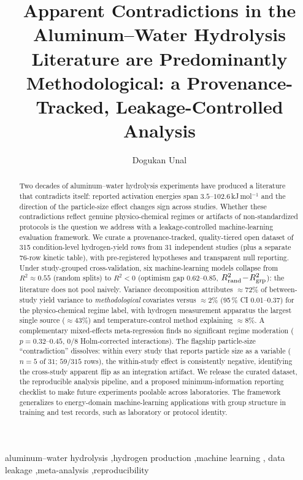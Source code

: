 \documentclass[preprint,12pt]{elsarticle}
\begin{document}
\begin{frontmatter}

\title{Apparent Contradictions in the Aluminum--Water Hydrolysis Literature
are Predominantly Methodological: a Provenance-Tracked, Leakage-Controlled Analysis}

\author[a]{Dogukan Unal}

\begin{abstract}
\noindent Two decades of aluminum--water hydrolysis experiments have produced a literature
that contradicts itself: reported activation energies span $3.5$--$102.6$\,kJ\,mol$^{-1}$
and the direction of the particle-size effect changes sign across studies. Whether these
contradictions reflect genuine physico-chemical regimes or artifacts of non-standardized
protocols is the question we address with a leakage-controlled machine-learning evaluation
framework. We curate a provenance-tracked, quality-tiered open dataset of 315 condition-level
hydrogen-yield rows from 31 independent studies (plus a separate 76-row kinetic table), with
pre-registered hypotheses and transparent null reporting. Under study-grouped cross-validation,
six machine-learning models collapse from $R^2\!\approx\!0.55$ (random splits)
to $R^2<0$ (optimism gap $0.62$--$0.85$, $R^2_{\rm rand}\!-\!R^2_{\rm grp}$): the literature does not pool naively. Variance decomposition attributes $\approx\!72\%$ of between-study
yield variance to \emph{methodological} covariates versus $\approx\!2\%$
(95\,\% CI 0.01--0.37) for the physico-chemical regime label,
with hydrogen measurement apparatus the largest single source ($\approx\!43\%$)
and temperature-control method explaining $\approx\!8\%$. A complementary mixed-effects meta-regression finds no significant
regime moderation ($p=0.32$--$0.45$, $0/8$ Holm-corrected interactions). The flagship
particle-size ``contradiction'' dissolves: within every study that reports particle size
as a variable ($n\!=\!5$ of $31$; $59/315$ rows), the within-study effect is consistently
negative, identifying the cross-study
apparent flip as an integration artifact. We release the curated dataset, the reproducible
analysis pipeline, and a proposed minimum-information reporting checklist to make future
experiments poolable across laboratories. The framework generalizes to energy-domain machine-learning applications with
group structure in training and test records, such as laboratory or protocol identity.
\end{abstract}

\begin{keyword}
aluminum--water hydrolysis \sep hydrogen production \sep machine learning \sep
data leakage \sep meta-analysis \sep reproducibility
\end{keyword}

\end{frontmatter}
\end{document}
